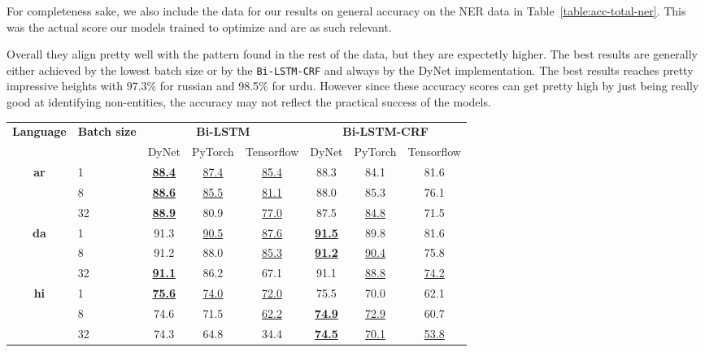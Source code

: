 For completeness sake, we also include the data for our results on general
accuracy on the NER data in Table~\ref{table:acc-total-ner}. This was the actual
score our models trained to optimize and are as such relevant. 

Overall they align pretty well with the pattern found in the rest of the data,
but they are expectetly higher. The best results are generally either achieved
by the lowest batch size or by the \texttt{Bi-LSTM-CRF} and always by the DyNet
implementation. The best results reaches pretty impressive heights with
97.3\% for russian and 98.5\% for urdu. However since these accuracy scores can
get pretty high by just being really good at identifying non-entities, the
accuracy may not reflect the practical success of the models.

\begin{table}[h!]
    \centering
    \begin{tabular}{c l c c c|c c c}
        \toprule
        \multirow{2}{*}{\bfseries Language} &
        \multirow{2}{*}{\bfseries Batch size} &
        \multicolumn{3}{c}{\bfseries Bi-LSTM} &
        \multicolumn{3}{c}{\bfseries Bi-LSTM-CRF} \\
        \cmidrule(lr){3-8}
        && DyNet & PyTorch & Tensorflow & DyNet & PyTorch & Tensorflow \\

        \cmidrule(lr){1-8}
        \multirow{3}{*}{\bfseries ar}
        &  1 & 
        \underline{\textbf{88.4}} & \underline{87.4} & \underline{85.4} &
        88.3 & 84.1 & 81.6 \\
        &  8 & 
        \underline{\textbf{88.6}} & \underline{85.5} & \underline{81.1} &
        88.0 & 85.3 & 76.1 \\
        & 32 & 
        \underline{\textbf{88.9}} & 80.9 & \underline{77.0} &
        87.5 & \underline{84.8} & 71.5 \\

        \cmidrule(lr){1-8}
        \multirow{3}{*}{\bfseries da}
        &  1 &
        91.3 & \underline{90.5} & \underline{87.6} &
        \underline{\textbf{91.5}} & 89.8 & 81.6 \\
        &  8 &
        91.2 & 88.0 & \underline{85.3} &
        \underline{\textbf{91.2}} & \underline{90.4} & 75.8 \\
        & 32 &
        \underline{\textbf{91.1}} & 86.2 & 67.1 &
        91.1 & \underline{88.8} & \underline{74.2} \\

        \cmidrule(lr){1-8}
        \multirow{3}{*}{\bfseries hi}
        &  1 &
        \underline{\textbf{75.6}} & \underline{74.0} & \underline{72.0} &
        75.5 & 70.0 & 62.1 \\
        &  8 &
        74.6 & 71.5 & \underline{62.2} &
        \underline{\textbf{74.9}} & \underline{72.9} & 60.7 \\
        & 32 &
        74.3 & 64.8 & 34.4 &
        \underline{\textbf{74.5}} & \underline{70.1} & \underline{53.8} \\


\end{tabular}
\end{table}
